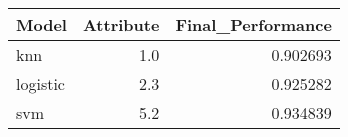 \begin{tabular}{lrr}
\toprule
   Model &  Attribute &  Final\_Performance \\
\midrule
     knn &        1.0 &           0.902693 \\
logistic &        2.3 &           0.925282 \\
     svm &        5.2 &           0.934839 \\
\bottomrule
\end{tabular}
